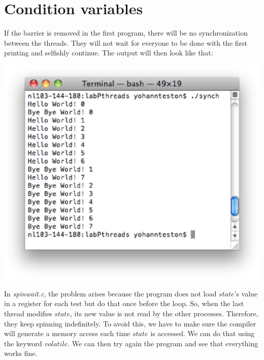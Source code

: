 \section{Condition variables}

If the barrier is removed in the first program, there will be no synchronization between the threads. They will not wait for everyone to be done with the first printing and selfishly continue. The output will then look like that:
\begin{center}
	\includegraphics[width=\textwidth]{pic/q5.eps}
\end{center}


In \textit{spinwait.c}, the problem arises because the program does not load $state$'s value in a register for each test but do that once before the loop. So, when the last thread modifies $state$, its new value is not read by the other processes. Therefore, they keep spinning indefinitely. To avoid this, we have to make sure the compiler will generate a memory access each time $state$ is accessed. We can do that using the keyword $volatile$. We can then try again the program and see that everything works fine. 
